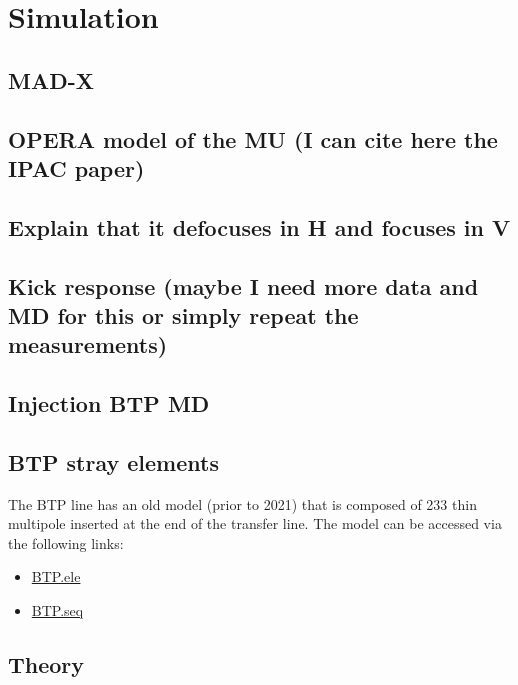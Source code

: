 \section{Simulation}
\label{section:simulation}

\subsection{MAD-X}

\subsection{OPERA model of the MU (I can cite here the IPAC paper)}

\subsection{Explain that it defocuses in H and focuses in V}

\cite{johnson_beam_2022}

\subsection{Kick response (maybe I need more data and MD for this or simply repeat the measurements)}

\subsection{Injection BTP MD}

\subsection{BTP stray elements}

The BTP line has an old model (prior to 2021) that is composed of 233 thin multipole inserted at the end of the transfer line. The model can be accessed via the following links:

\begin{itemize}
    \item \href{https://gitlab.cern.ch/acc-models/acc-models-tls/-/blob/2021/psb_extraction/btp/BTP.ele}{BTP.ele}
    \item \href{https://gitlab.cern.ch/acc-models/acc-models-tls/-/blob/2021/psb_extraction/btp/BTP.seq}{BTP.seq}
\end{itemize}



\subsection{Theory}

